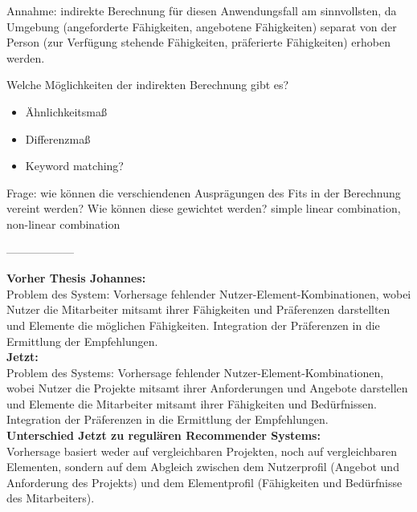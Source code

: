 Annahme: indirekte Berechnung für diesen Anwendungsfall am sinnvollsten, da Umgebung (angeforderte Fähigkeiten, angebotene Fähigkeiten) separat von der Person (zur Verfügung stehende Fähigkeiten, präferierte Fähigkeiten) erhoben werden.

Welche Möglichkeiten der indirekten Berechnung gibt es?
\begin{itemize}
    \item Ähnlichkeitsmaß %
    \item Differenzmaß %
    \item Keyword matching? %
\end{itemize}

Frage: wie können die verschiendenen Ausprägungen des Fits in der Berechnung vereint werden? Wie können diese gewichtet werden? simple linear combination, non-linear combination %

------------------


\textbf{Vorher Thesis Johannes:}\\
Problem des System: Vorhersage fehlender Nutzer-Element-Kombinationen, wobei Nutzer die Mitarbeiter mitsamt ihrer Fähigkeiten und Präferenzen darstellten und Elemente die möglichen Fähigkeiten. Integration der Präferenzen in die Ermittlung der Empfehlungen.\\
\textbf{Jetzt:}\\
Problem des Systems: Vorhersage fehlender Nutzer-Element-Kombinationen, wobei Nutzer die Projekte mitsamt ihrer Anforderungen und Angebote darstellen und Elemente die Mitarbeiter mitsamt ihrer Fähigkeiten und Bedürfnissen. Integration der Präferenzen in die Ermittlung der Empfehlungen.\\
\textbf{Unterschied Jetzt zu regulären Recommender Systems:}\\
Vorhersage basiert weder auf vergleichbaren Projekten, noch auf vergleichbaren Elementen, sondern auf dem Abgleich zwischen dem Nutzerprofil (Angebot und Anforderung des Projekts) und dem Elementprofil (Fähigkeiten und Bedürfnisse des Mitarbeiters). %

